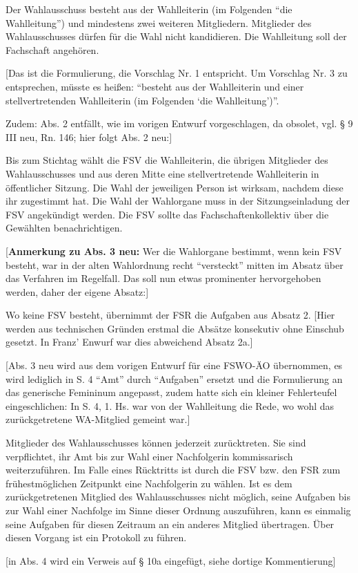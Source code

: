 \documentclass[%
draft,%
multilinesections%
]{fswo}
\newcommand\bemFr[1]{{\color{Red}[#1]}}
\newcommand\bemFe[1]{{\color{Cyan}[#1]}}
\newcommand\bemFr[1]{}%
\newcommand\bemFe[1]{}%
\begin{document}
\begin{contract}
Der Wahlausschuss besteht aus der Wahlleiterin (im Folgenden \enquote{die Wahlleitung}) und mindestens zwei weiteren Mitgliedern.
Mitglieder des Wahlausschusses dürfen für die Wahl nicht kandidieren.
Die Wahlleitung soll der Fachschaft angehören.
%
\begin{addmargin}{1cm}
\bemFr{Das ist die Formulierung, die Vorschlag Nr. 1 entspricht.
Um Vorschlag Nr. 3 zu entsprechen, müsste es heißen: \enquote{besteht aus der Wahlleiterin und einer stellvertretenden Wahlleiterin (im Folgenden \enquote{die Wahlleitung})}.

Zudem: Abs. 2 entfällt, wie im vorigen Entwurf vorgeschlagen, da obsolet, vgl. § 9 III neu, Rn. 146; hier folgt Abs. 2 neu:}
\end{addmargin}


Bis zum Stichtag wählt die FSV die Wahlleiterin, die übrigen Mitglieder des Wahlausschusses und aus deren Mitte eine stellvertretende Wahlleiterin in öffentlicher Sitzung.
Die Wahl der jeweiligen Person ist wirksam, nachdem diese ihr zugestimmt hat.
Die Wahl der Wahlorgane muss in der Sitzungseinladung der FSV angekündigt werden.
Die FSV sollte das Fachschaftenkollektiv über die Gewählten benachrichtigen.
%
\begin{addmargin}{1cm}
\bemFr{\textbf{Anmerkung zu Abs. 3 neu:} Wer die Wahlorgane bestimmt, wenn kein FSV besteht,
war in der alten Wahlordnung recht \enquote{versteckt} mitten im Absatz über das Verfahren im Regelfall.
Das soll nun etwas prominenter hervorgehoben werden, daher der eigene Absatz:}
\end{addmargin}

Wo keine FSV besteht, übernimmt der FSR die Aufgaben aus Absatz 2.
\bemFe{Hier werden aus technischen Gründen erstmal die Absätze konsekutiv ohne Einschub gesetzt. In Franz' Enwurf war dies abweichend Absatz 2a.}
%
\begin{addmargin}{1cm}
\bemFr{Abs. 3 neu wird aus dem vorigen Entwurf für eine FSWO-ÄO übernommen, es wird lediglich in S. 4 \enquote{Amt} durch \enquote{Aufgaben} ersetzt und die Formulierung an das generische Femininum angepasst,
zudem hatte sich ein kleiner Fehlerteufel eingeschlichen:
In S. 4, 1. Hs. war von der Wahlleitung die Rede, wo wohl das zurückgetretene WA-Mitglied gemeint war.}
\end{addmargin}

Mitglieder des Wahlausschusses können jederzeit zurücktreten.
Sie sind verpflichtet, ihr Amt bis zur Wahl einer Nachfolgerin kommissarisch weiterzuführen.
Im Falle eines Rücktritts ist durch die FSV bzw. den FSR zum frühestmöglichen Zeitpunkt eine Nachfolgerin zu wählen.
Ist es dem zurückgetretenen Mitglied des Wahlausschusses nicht möglich, seine Aufgaben bis zur Wahl einer Nachfolge im Sinne dieser Ordnung auszuführen, kann es einmalig seine Aufgaben für diesen Zeitraum an ein anderes Mitglied übertragen.
Über diesen Vorgang ist ein Protokoll zu führen.
%
\begin{addmargin}{1cm}
\bemFr{in Abs. 4 wird ein Verweis auf § 10a eingefügt, siehe dortige Kommentierung}
\end{addmargin}


\end{contract}
\end{document}
